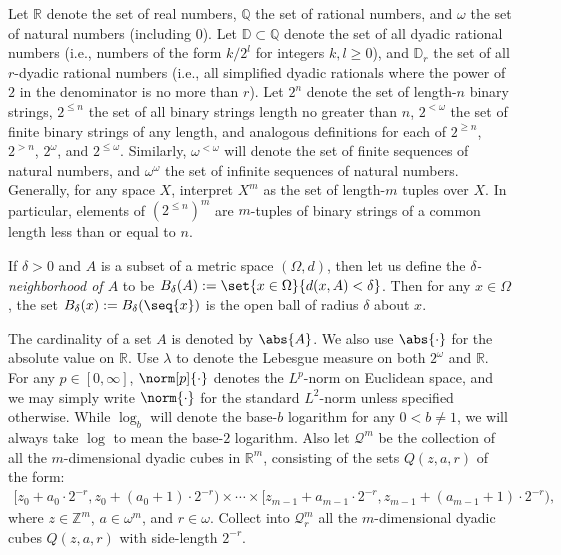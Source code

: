 Let $\mathbb{R}$ denote the set of real numbers, $\mathbb{Q}$ the set of rational numbers, and $\omega$ the set of natural numbers (including $0$). Let $\mathbb{D} \subset \mathbb{Q}$ denote the set of all dyadic rational numbers (i.e., numbers of the form $k / 2^l$ for integers $k, l \geq 0$), and $\mathbb{D}_r$ the set of all $r$-dyadic rational numbers (i.e., all simplified dyadic rationals where the power of $2$ in the denominator is no more than $r$). 
Let $2^n$ denote the set of length-$n$ binary strings, $2^{\leq n}$ the set of all binary strings length no greater than $n$, $2^{< \omega}$ the set of finite binary strings of any length, and analogous definitions for each of $2^{\geq n}$, $2^{> n}$, $2^\omega$, and $2^{\leq \omega}$. Similarly, $\omega^{<\omega}$ will denote the set of finite sequences of natural numbers, and $\omega^\omega$ the set of infinite sequences of natural numbers. Generally, for any space $X$, interpret $X^m$ as the set of length-$m$ tuples over $X$. In particular, elements of $(2^{\leq n})^m$ are $m$-tuples of binary strings of a common length less than or equal to $n$. 

If $\delta > 0$ and $A$ is a subset of a metric space $(\Omega, d)$, then let us define the \textit{$\delta$-neighborhood of $A$} to be $B_\delta(A) := \set{x \in \Omega}{d(x, A) < \delta}$. Then for any $x \in \Omega$, the set $B_\delta(x) := B_\delta(\seq{x})$ is the open ball of radius $\delta$ about $x$.

The cardinality of a set $A$ is denoted by $\abs{A}$. We also use $\abs{\cdot}$ for the absolute value on $\mathbb{R}$. Use $\lambda$ to denote the Lebesgue measure on both $2^\omega$ and $\mathbb{R}$. For any $p \in [0, \infty]$, $\norm[p]{\cdot}$ denotes the $L^p$-norm on Euclidean space, and we may simply write $\norm{\cdot}$ for the standard $L^2$-norm unless specified otherwise. While $\log_b$ will denote the base-$b$ logarithm for any $0 < b \neq 1$, we will always take $\log$ to mean the base-$2$ logarithm. Also let $\mathcal{Q}^m$ be the collection of all the $m$-dimensional dyadic cubes in $\mathbb{R}^m$, consisting of the sets $Q(z, a, r)$ of the form:
\begin{align*}
    [z_0 + a_0 \cdot 2^{-r}, z_0 + (a_0 + 1) \cdot 2^{-r}) \times \cdots \times [z_{m - 1} + a_{m - 1} \cdot 2^{-r}, z_{m - 1} + (a_{m - 1} + 1) \cdot 2^{-r}),
\end{align*}
where $z \in \mathbb{Z}^m$, $a \in \omega^m$, and $r \in \omega$. Collect into $\mathcal{Q}^m_r$ all the $m$-dimensional dyadic cubes $Q(z, a, r)$ with side-length $2^{-r}$.

